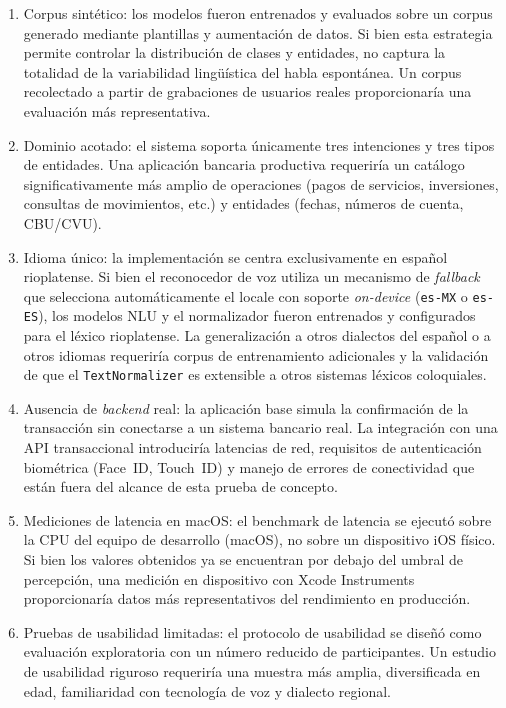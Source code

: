 \begin{enumerate}
    \item Corpus sintético: los modelos fueron entrenados y evaluados sobre un corpus generado mediante plantillas y aumentación de datos. Si
    bien esta estrategia permite controlar la distribución de clases y entidades, no captura la totalidad de la variabilidad lingüística del habla
    espontánea. Un corpus recolectado a partir de grabaciones de usuarios reales proporcionaría una evaluación más representativa.

    \item Dominio acotado: el sistema soporta únicamente tres intenciones y tres tipos de entidades. Una aplicación bancaria productiva
    requeriría un catálogo significativamente más amplio de operaciones (pagos de servicios, inversiones, consultas de movimientos, etc.) y entidades
    (fechas, números de cuenta, CBU/CVU).

    \item Idioma único: la implementación se centra exclusivamente en español rioplatense. Si bien el reconocedor de voz utiliza un mecanismo de \textit{fallback} que selecciona automáticamente el locale con soporte \textit{on-device} (\texttt{es-MX} o \texttt{es-ES}), los modelos NLU y el normalizador fueron entrenados y configurados para el léxico rioplatense. La generalización a otros dialectos del español o a otros idiomas requeriría corpus de entrenamiento adicionales y la validación de que el \texttt{Text\allowbreak{}Normalizer} es extensible a otros sistemas léxicos coloquiales.

    \item Ausencia de \textit{backend} real: la aplicación base simula la confirmación de la transacción sin conectarse a un sistema bancario real.
    La integración con una API transaccional introduciría latencias de red, requisitos de autenticación biométrica (Face~ID, Touch~ID) y manejo de
    errores de conectividad que están fuera del alcance de esta prueba de concepto.

    \item Mediciones de latencia en macOS: el benchmark de latencia se ejecutó sobre la CPU del equipo de desarrollo (macOS), no sobre un
    dispositivo iOS físico. Si bien los valores obtenidos ya se encuentran por debajo del umbral de percepción, una medición en dispositivo con Xcode
    Instruments proporcionaría datos más representativos del rendimiento en producción.

    \item Pruebas de usabilidad limitadas: el protocolo de usabilidad se diseñó como evaluación exploratoria con un número reducido de
    participantes. Un estudio de usabilidad riguroso requeriría una muestra más amplia, diversificada en edad, familiaridad con tecnología de voz y
    dialecto regional.
\end{enumerate}

